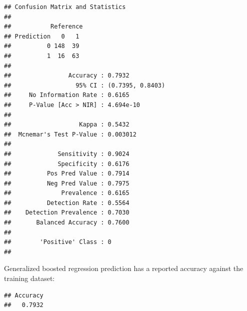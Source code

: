 \documentclass[]{article}
\newenvironment{Shaded}{\begin{snugshade}}{\end{snugshade}}
\newcommand{\KeywordTok}[1]{\textcolor[rgb]{0.13,0.29,0.53}{\textbf{{#1}}}}
\newcommand{\DataTypeTok}[1]{\textcolor[rgb]{0.13,0.29,0.53}{{#1}}}
\newcommand{\DecValTok}[1]{\textcolor[rgb]{0.00,0.00,0.81}{{#1}}}
\newcommand{\StringTok}[1]{\textcolor[rgb]{0.31,0.60,0.02}{{#1}}}
\newcommand{\NormalTok}[1]{{#1}}
\begin{document}
\begin{verbatim}
## Confusion Matrix and Statistics
## 
##           Reference
## Prediction   0   1
##          0 148  39
##          1  16  63
##                                           
##                Accuracy : 0.7932          
##                  95% CI : (0.7395, 0.8403)
##     No Information Rate : 0.6165          
##     P-Value [Acc > NIR] : 4.694e-10       
##                                           
##                   Kappa : 0.5432          
##  Mcnemar's Test P-Value : 0.003012        
##                                           
##             Sensitivity : 0.9024          
##             Specificity : 0.6176          
##          Pos Pred Value : 0.7914          
##          Neg Pred Value : 0.7975          
##              Prevalence : 0.6165          
##          Detection Rate : 0.5564          
##    Detection Prevalence : 0.7030          
##       Balanced Accuracy : 0.7600          
##                                           
##        'Positive' Class : 0               
## 
\end{verbatim}

Generalized boosted regression prediction has a reported accuracy
against the training dataset:

\begin{Shaded}
\end{Shaded}

\begin{verbatim}
## Accuracy 
##   0.7932
\end{verbatim}

\begin{Shaded}
\end{Shaded}
\end{document}
